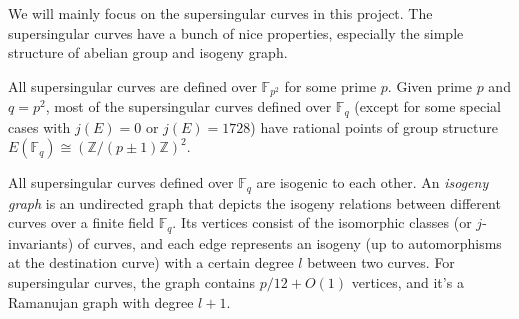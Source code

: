 We will mainly focus on the supersingular curves in this project. The supersingular curves have a bunch of nice properties, especially the simple structure of abelian group and isogeny graph.

\begin{proposition} All supersingular curves are defined over $\mathbb F_{p^2}$ for some prime $p$. Given prime $p$ and $q=p^2$, most of the supersingular curves defined over $\mathbb F_q$ (except for some special cases with $j(E)=0$ or $j(E)=1728$) have rational points of group structure $E(\mathbb F_q)\cong(\mathbb Z/(p\pm 1)\mathbb Z)^2$.

\end{proposition}

\begin{definition} All supersingular curves defined over $\mathbb F_q$ are isogenic to each other. An \textit{isogeny graph} is an undirected graph that depicts the isogeny relations between different curves over a finite field $\mathbb F_q$. Its vertices consist of the isomorphic classes (or $j$-invariants) of curves, and each edge represents an isogeny (up to automorphisms at the destination curve) with a certain degree $l$ between two curves. For supersingular curves, the graph contains $p/12+O(1)$ vertices, and it's a Ramanujan graph with degree $l+1$.
\end{definition}